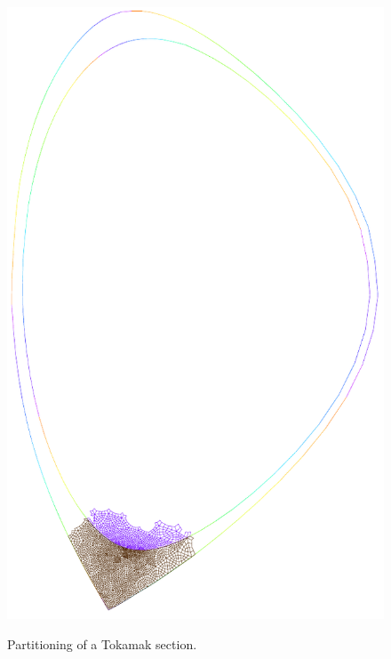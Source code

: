 \begin{figure}
{\includegraphics[scale=.5]{images/tokamak_layer_mesh_adapt_fine_3_par.pdf}}\quad
\caption{Partitioning of a Tokamak section.}\label{fig:partitioning}
\end{figure}

